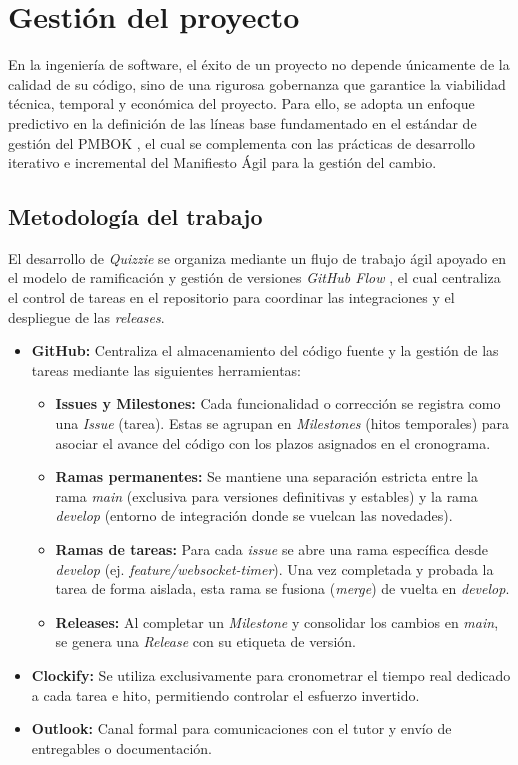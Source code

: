 \chapter{Gestión del proyecto}\label{cap:gestion_del_proyecto}

En la ingeniería de software, el éxito de un proyecto no depende únicamente de la calidad de su código, sino de una rigurosa gobernanza que garantice la viabilidad técnica, temporal y económica del proyecto. Para ello, se adopta un enfoque predictivo en la definición de las líneas base fundamentado en el estándar de gestión del PMBOK \cite{pmi2021pmbok}, el cual se complementa con las prácticas de desarrollo iterativo e incremental del Manifiesto Ágil \cite{beck2001manifesto} para la gestión del cambio.

\section{Metodología del trabajo}\label{sec:metodologia_del_trabajo}
El desarrollo de \textit{Quizzie} se organiza mediante un flujo de trabajo ágil apoyado en el modelo de ramificación y gestión de versiones \textit{GitHub Flow} \cite{chacon2014pro}, el cual centraliza el control de tareas en el repositorio para coordinar las integraciones y el despliegue de las \textit{releases}.

\begin{itemize}
\item \textbf{GitHub:} Centraliza el almacenamiento del código fuente y la gestión de las tareas mediante las siguientes herramientas:    
    \begin{itemize}
        \item \textbf{Issues y Milestones:} Cada funcionalidad o corrección se registra como una \textit{Issue} (tarea). Estas se agrupan en \textit{Milestones} (hitos temporales) para asociar el avance del código con los plazos asignados en el cronograma.
        \item \textbf{Ramas permanentes:} Se mantiene una separación estricta entre la rama \textit{main} (exclusiva para versiones definitivas y estables) y la rama \textit{develop} (entorno de integración donde se vuelcan las novedades).
        \item \textbf{Ramas de tareas:} Para cada \textit{issue} se abre una rama específica desde \textit{develop} (ej. \textit{feature/websocket-timer}). Una vez completada y probada la tarea de forma aislada, esta rama se fusiona (\textit{merge}) de vuelta en \textit{develop}.      
        \item \textbf{Releases:} Al completar un \textit{Milestone} y consolidar los cambios en \textit{main}, se genera una \textit{Release} con su etiqueta de versión. 
    \end{itemize}
    \item \textbf{Clockify:} Se utiliza exclusivamente para cronometrar el tiempo real dedicado a cada tarea e hito, permitiendo controlar el esfuerzo invertido.
    \item \textbf{Outlook:} Canal formal para comunicaciones con el tutor y envío de entregables o documentación.
\end{itemize}

